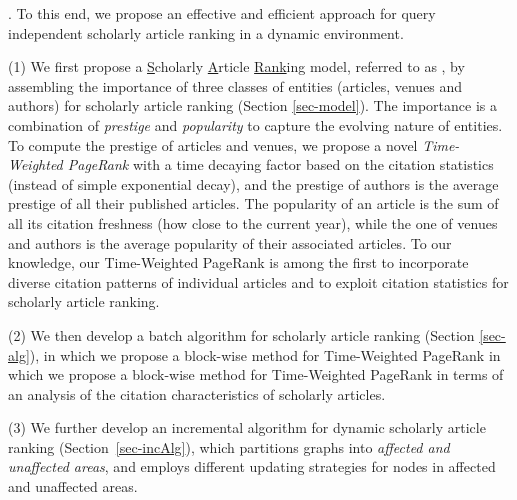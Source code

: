 .
To this end, we propose an effective and efficient approach for query independent scholarly article ranking in a dynamic environment.

\sstab(1) We first  propose a \underline{S}cholarly \underline{A}rticle \underline{Rank}ing model, referred to as \ensemblerank, by assembling the importance of three classes of entities (articles, venues and authors) for scholarly article ranking (Section \ref{sec-model}).
%
The importance is a combination of {\em prestige} and {\em popularity} to capture the evolving nature of entities.
%
To compute the prestige of articles and venues, we propose a novel {\em Time-Weighted PageRank} with a time decaying factor based on the citation statistics (instead of simple exponential decay), and the prestige of authors is the average prestige of all their published articles.
%
The popularity of an article is the sum of all its citation freshness (how close to the current year), while the one of venues and authors is the average popularity of their associated articles.
%
%
To our knowledge, our Time-Weighted PageRank is among the first to incorporate diverse citation patterns of individual articles and to exploit citation statistics for scholarly article ranking.

\sstab(2)  We then develop  a batch algorithm for scholarly article ranking (Section \ref{sec-alg}), in which we propose a block-wise method for Time-Weighted PageRank %
in which we propose a block-wise method for Time-Weighted PageRank in terms of an analysis of the citation characteristics of scholarly articles.

\sstab(3)
We further develop an incremental algorithm for dynamic scholarly article ranking (Section~\ref{sec-incAlg}), which partitions graphs into  {\em affected and unaffected areas}, and employs different updating strategies for nodes in affected and unaffected areas.


